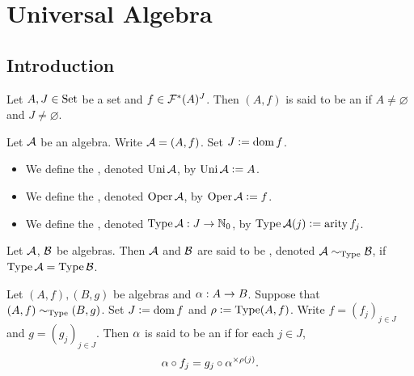 \documentclass{book}
\begin{document}
	
	
	
	
	
	
	
	
	
	
	
	
	
	
	
	
	
	
	
	\newpage
	\chapter{Universal Algebra}
	
	\section{Introduction}
	
	\begin{defn}
		Let $A,J \in \text{Set}$ be a set and $f \in \mathcal{F}^*(A)^J$. Then $(A, f)$ is said to be an  if $A \neq \varnothing$ and $J \neq \varnothing$. 
	\end{defn}
	
	\begin{defn}
		Let $\mathcal{A}$ be an algebra. Write $\mathcal{A} = (A, f)$. Set $J \vcentcolon= \operatorname{dom} f$. 
		\begin{itemize}
			\item We define the , denoted $\operatorname{Uni}\mathcal{A}$, by $\operatorname{Uni}\mathcal{A} \vcentcolon= A$.
			\item We define the , denoted $\operatorname{Oper}\mathcal{A}$, by $\operatorname{Oper}\mathcal{A} \vcentcolon= f$.
			\item We define the , denoted $\operatorname{Type}\mathcal{A}: J \rightarrow \mathbb{N}_0$, by $\operatorname{Type}\mathcal{A}(j) \vcentcolon= \operatorname*{\text{arity}} f_j$.
		\end{itemize}
	\end{defn}

	\begin{defn}
		Let $\mathcal{A}$, $\mathcal{B}$ be algebras. Then $\mathcal{A}$ and $\mathcal{B}$ are said to be , denoted $\mathcal{A} \sim_{\operatorname{Type}} \mathcal{B}$, if $\operatorname{Type} \mathcal{A} = \operatorname{Type} \mathcal{B}$.
	\end{defn}
	
	\begin{defn}
		Let $(A, f), (B, g)$ be algebras and $\alpha:A \rightarrow B$. Suppose that $(A, f) \sim_{\operatorname{Type}} (B, g)$. Set $J \vcentcolon= \operatorname{dom} f$ and $\rho \vcentcolon= \operatorname{Type}(A, f)$. Write $f = (f_j)_{j \in J}$ and $g = (g_j)_{j \in J}$. Then $\alpha$ is said to be an  if for each $j \in J$, 
		$$\alpha \circ f_j = g_j \circ \alpha^{\times \rho(j)}.$$
	\end{defn}
	
\end{document}
